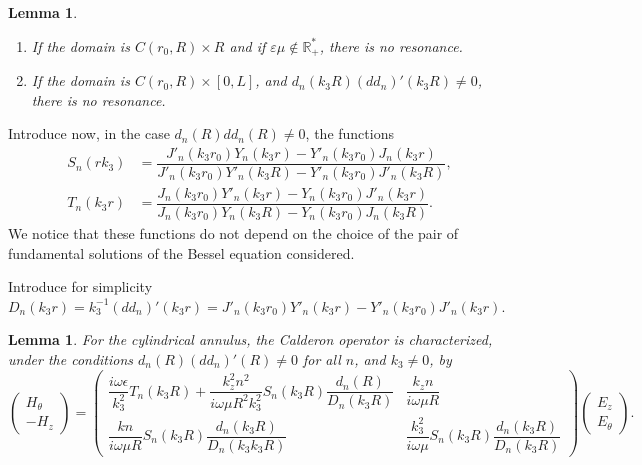 \documentclass[12pt,%
    twoside,%
    a4paper,%
    openright, %
    ]{book}
\numberwithin{equation}{section} %
\newtheorem{lemma}[thm]{Lemma}
\renewcommand{\frac}[2]{\dfrac{#1}{#2}} %
\begin{document}
            \begin{lemma}
                \begin{enumerate}
                \item If the domain is $C(r_0,R)\times R$ and if $\varepsilon \mu \notin \mathbb R^*_+$, there is no resonance.
                \item If the domain is $C(r_0, R)\times [0,L]$, and $d_n(k_3R)(dd_n)'(k_3R)\not=0$, there is no resonance.
                \end{enumerate}
            \end{lemma}
            Introduce now, in the case $d_n(R)dd_n(R)\not=0$, the functions
            \begin{align*}
                S_n(rk_3) &= \frac{J'_n(k_3r_0)Y_n(k_3r)-Y'_n(k_3r_0)J_n(k_3r)}{J'_n(k_3r_0)Y'_n(k_3R)-Y'_n(k_3r_0)J'_n(k_3R)},
                \\
                T_n(k_3r) &= \frac{J_n(k_3r_0)Y'_n(k_3r)-Y_n(k_3r_0)J'_n(k_3r)}{J_n(k_3r_0)Y_n(k_3R)-Y_n(k_3r_0)J_n(k_3R)}.
            \end{align*}
            We notice that these functions do not depend on the choice of the pair of fundamental solutions of the Bessel equation considered. 

            Introduce for simplicity $D_n(k_3r)=k_3^{-1}(dd_n)'(k_3r)= J'_n(k_3r_0)Y'_n(k_3r)-Y'_n(k_3r_0)J'_n(k_3r)$.

            \begin{lemma}
            \label{Z-lemme}
            For the cylindrical annulus, the Calderon operator is characterized, under the conditions $d_n(R)(dd_n)'(R)\not=0$ for all $n$, and $k_3\not=0$, by
            $$
            \begin{pmatrix}
                H_{\theta}
                \\
                -H_z
            \end{pmatrix}
            =
            \begin{pmatrix}
                \frac{i\omega \epsilon}{k_3^2}T_n(k_3R)+\frac{k_z^2n^2}{i\omega \mu R^2k_3^2}S_n(k_3R)\frac{d_n(R)}{D_n(k_3R)} & \frac{k_zn}{i\omega \mu R}
                \\
                \frac{kn}{i\omega \mu R}S_n(k_3R)\frac{d_n(k_3R)}{D_n(k_3k_3R)} & \frac{k_3^2}{i\omega \mu}S_n(k_3R)\frac{d_n(k_3R)}{D_n(k_3R)}
            \end{pmatrix}
            \begin{pmatrix}
                E_z
                \\
                E_{\theta}
            \end{pmatrix}.$$
            \end{lemma}
\end{document}
